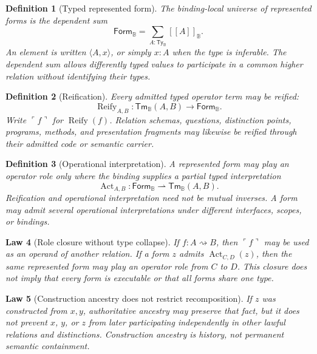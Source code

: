 \documentclass[11pt,oneside]{article}
\newtheorem{definition}{Definition}[section]
\newtheorem{law}[definition]{Law}
\newcommand{\B}{\mathbb B}
\newcommand{\den}[1]{[\![#1]\!]}
\begin{document}
\begin{definition}[Typed represented form]
The binding-local universe of represented forms is the dependent sum
\[
\boxed{
\mathsf{Form}_{\B}
=
\sum_{A:\mathsf{Ty}_{\B}}\den{A}_{\B}.
}
\]
An element is written \(\langle A,x\rangle\), or simply \(x:A\) when the type is inferable.  The dependent sum allows differently typed values to participate in a common higher relation without identifying their types.
\end{definition}

\begin{definition}[Reification]
Every admitted typed operator term may be reified:
\[
\boxed{
\operatorname{Reify}_{A,B}:
\mathsf{Tm}_{\B}(A,B)
\to
\mathsf{Form}_{\B}.
}
\]
Write \(\ulcorner f\urcorner\) for \(\operatorname{Reify}(f)\).  Relation schemas, questions, distinction points, programs, methods, and presentation fragments may likewise be reified through their admitted code or semantic carrier.
\end{definition}

\begin{definition}[Operational interpretation]
A represented form may play an operator role only where the binding supplies a partial typed interpretation
\[
\boxed{
\operatorname{Act}_{A,B}:
\mathsf{Form}_{\B}
\rightharpoonup
\mathsf{Tm}_{\B}(A,B).
}
\]
Reification and operational interpretation need not be mutual inverses.  A form may admit several operational interpretations under different interfaces, scopes, or bindings.
\end{definition}

\begin{law}[Role closure without type collapse]
If \(f:A\rightsquigarrow B\), then \(\ulcorner f\urcorner\) may be used as an operand of another relation.  If a form \(z\) admits \(\operatorname{Act}_{C,D}(z)\), then the same represented form may play an operator role from \(C\) to \(D\).  This closure does not imply that every form is executable or that all forms share one type.
\end{law}

\begin{law}[Construction ancestry does not restrict recomposition]
If \(z\) was constructed from \(x,y\), authoritative ancestry may preserve that fact, but it does not prevent \(x\), \(y\), or \(z\) from later participating independently in other lawful relations and distinctions.  Construction ancestry is history, not permanent semantic containment.
\end{law}
\end{document}
